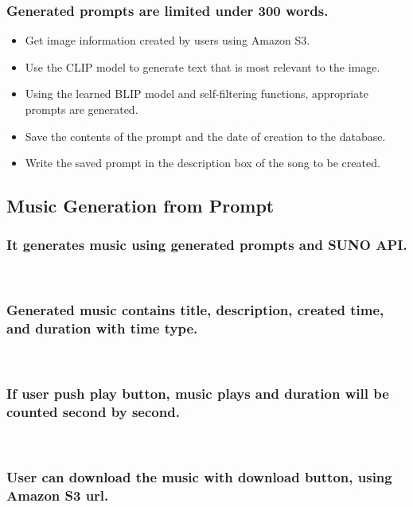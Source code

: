 \documentclass[conference]{IEEEtran}
\begin{document}
\subsubsection{ Generated prompts are limited under 300 words.}
\begin{itemize}
    \item Get image information created by users using Amazon S3. \\
    \item Use the CLIP model to generate text that is most relevant to the image.\\
    \item Using the learned BLIP model and self-filtering functions, appropriate prompts are generated.\\
    \item Save the contents of the prompt and the date of creation to the database.\\
    \item Write the saved prompt in the description box of the song to be created.\\
\end{itemize}


\subsection{Music Generation from Prompt }

\subsubsection{It generates music using generated prompts and SUNO API.}
\

\subsubsection{Generated music contains title, description, created time, and duration with time type.}
\

\subsubsection{If user push play button, music plays and duration will be counted second by second.}
\

\subsubsection{User can download the music with download button, using Amazon S3 url.}\\
\end{document}
